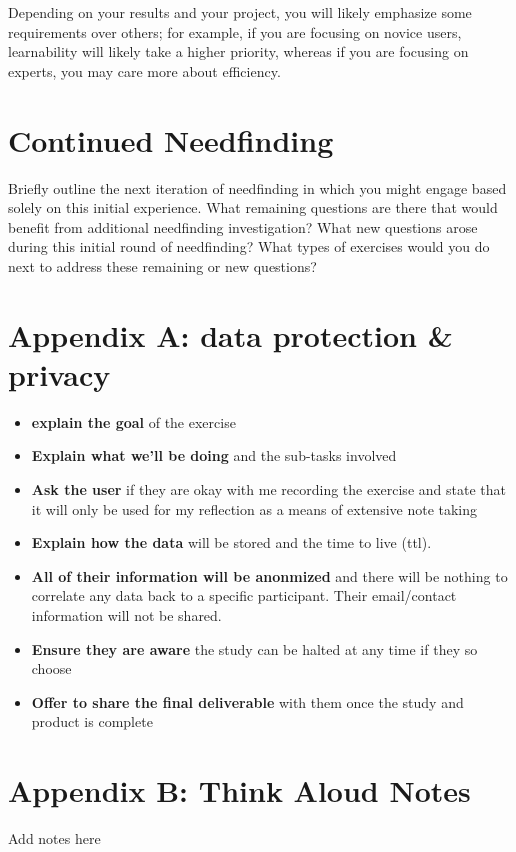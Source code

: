 Depending on your results and your project, you will likely emphasize some requirements over others; for example, if you are focusing on novice users, learnability will likely take a higher priority, whereas if you are focusing on experts, you may care more about efficiency.


\section{Continued Needfinding}
Briefly outline the next iteration of needfinding in which you might engage based solely on this initial experience. What remaining questions are there that would benefit from additional needfinding investigation? What new questions arose during this initial round of needfinding? What types of exercises would you do next to address these remaining or new questions?


\section{Appendix A: data protection & privacy}

\begin{itemize}
\item
  \textbf{explain the goal} of the exercise
\item
  \textbf{Explain what we'll be doing} and the sub-tasks involved
\item
  \textbf{Ask the user} if they are okay with me recording the exercise and state that it will only be used for my reflection as a means of extensive note taking
\item
  \textbf{Explain how the data} will be stored and the time to live (ttl).
\item
  \textbf{All of their information will be anonmized} and there will be nothing to correlate any data back to a specific participant. Their email/contact information will not be shared.
\item
  \textbf{Ensure they are aware} the study can be halted at any time if they so choose
\item
  \textbf{Offer to share the final deliverable} with them once the study and product is complete
\end{itemize}


\section{Appendix B: Think Aloud Notes}
Add notes here


